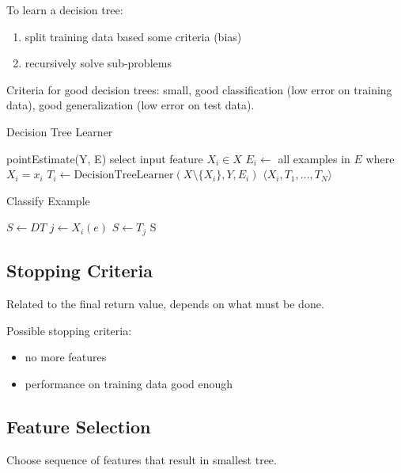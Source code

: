 \documentclass[11pt]{article}
\begin{document}
To learn a decision tree:
\begin{enumerate}
\item split training data based some criteria (bias)
\item recursively solve sub-problems
\end{enumerate}

Criteria for good decision trees: small, good classification (low error on training data), good generalization (low error on test data).

\begin{algorithm}
\caption{Decision Tree Learner}
\begin{algorithmic}[1]
        \State \Return pointEstimate(Y, E)
    \Else
        \State select input feature \( X_i \in X \)
            \State \( E_i \gets \) all examples in \( E \) where \( X_i = x_i \)
            \State \( T_i \gets \text{DecisionTreeLearner}(X \setminus \{X_i\}, Y, E_i) \)
        \EndFor
        \State \Return \( \langle X_i, T_1, \ldots, T_N \rangle \)
    \EndIf
\EndProcedure
\end{algorithmic}
\end{algorithm}

\begin{algorithm}
\caption{Classify Example}
\begin{algorithmic}[1]
    \State \( S \gets DT \)
        \State \( j \gets X_i(e) \)
        \State \( S \gets T_j \)
    \EndWhile
    \State \Return S
\EndProcedure
\end{algorithmic}
\end{algorithm}
\subsection{Stopping Criteria}
\label{sec:org1beab73}
Related to the final return value, depends on what must be done.

Possible stopping criteria:
\begin{itemize}
\item no more features
\item performance on training data good enough
\end{itemize}
\subsection{Feature Selection}
\label{sec:org8360a81}
Choose sequence of features that result in smallest tree.
\end{document}
